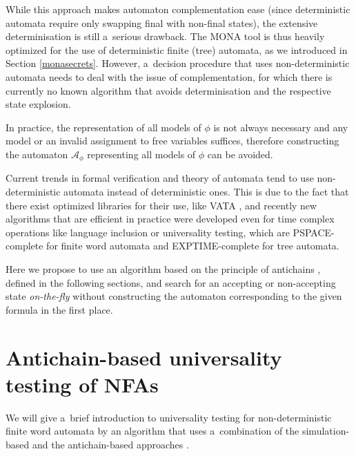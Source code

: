 While this approach makes automaton complementation ease (since deterministic
automata require only swapping final with non-final states), the extensive
determinisation is still a~serious drawback. The \textsc{MONA} tool is
thus heavily optimized for the use of deterministic finite (tree)
automata, as we introduced in Section \ref{monasecrets}. However, a~decision
procedure that uses non-deterministic automata needs to deal with the issue of
complementation, for which there is currently no known algorithm that avoids
determinisation and the respective state explosion.

In practice, the representation of all models of $\phi$ is not always necessary
and any model or an invalid assignment to free variables suffices, therefore
constructing the automaton $\mathcal{A}_{\phi}$ representing all models of
$\phi$ can be avoided.

Current trends in formal verification and theory of automata tend to use
non-deter\-ministic automata instead of deterministic ones. This is due to the
fact that there exist optimized libraries for their use, like VATA
\cite{vata}, and recently new algorithms that are efficient in practice
were developed even for time complex operations like language inclusion or
universality testing, which are PSPACE-complete for finite word automata and
EXPTIME-complete for tree automata.

Here we propose to use an algorithm based on the principle of antichains
\cite{tacas}, defined in the following sections, and search for an accepting
or non-accepting state \emph{on-the-fly} without constructing the automaton
corresponding to the given formula in the first place.

\section{Antichain-based universality testing of NFAs}

We will give a~brief introduction to universality testing for non-deterministic
finite word automata by an algorithm that uses a~combination
of the simulation-based and the antichain-based approaches \cite{tacas}.
\newpage

